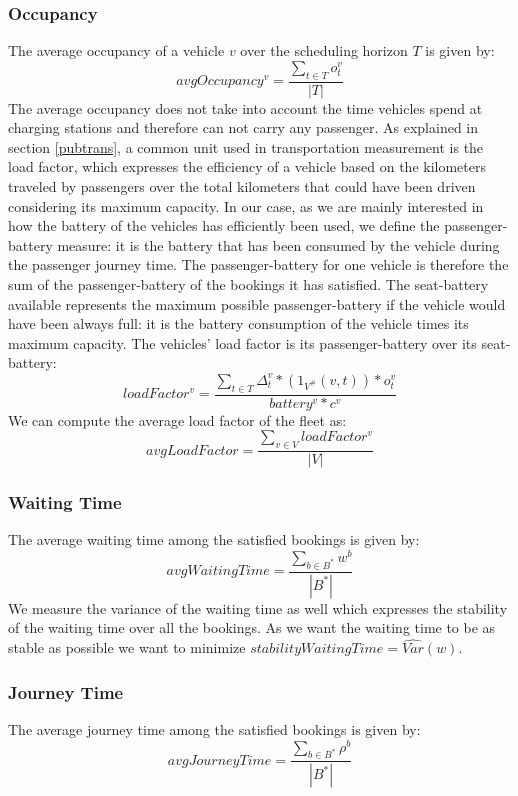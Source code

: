 \documentclass[12pt,a4paper]{article}
\begin{document}
\subsubsection*{Occupancy}
The average occupancy of a vehicle $v$ over the scheduling horizon $T$ is given by:
$$avgOccupancy^{v} = \frac{\sum_{t \in T}o^{v}_{t}}{|T|}$$
The average occupancy does not take into account the time vehicles spend at charging stations and therefore can not carry any passenger. As explained in section \ref{pubtrans}, a common unit used in transportation  measurement is the load factor, which expresses the efficiency of a vehicle based on the kilometers traveled by passengers over the total kilometers that could have been driven considering its maximum capacity. In our case, as we are mainly interested in how the battery of the vehicles has efficiently been used, we define the passenger-battery measure: it is the battery that has been consumed by the vehicle during the passenger journey time. The passenger-battery for one vehicle is therefore the sum of the passenger-battery of the bookings it has satisfied. The seat-battery available represents the maximum possible passenger-battery if the vehicle would have been always full: it is the battery consumption of the vehicle times its maximum capacity. The vehicles' load factor is its passenger-battery over its seat-battery:
$$loadFactor^{v} = \frac{\sum_{t \in T} \Delta^{v}_{t} * (1_{V^{\#}}(v,t)) * o^{v}_{t}}{battery^{v} * c^{v}}$$
We can compute the average load factor of the fleet as:
$$avgLoadFactor = \frac{\sum_{v \in V}loadFactor^{v}}{|V|}$$
\subsubsection*{Waiting Time}
The average waiting time among the satisfied bookings is given by: 
$$avgWaitingTime = \frac{\sum_{b \in B^{*}}w^{b}}{|B^{*}|} $$
We measure the variance of the waiting time as well which expresses the stability of the waiting time over all the bookings. As we want the waiting time to be as stable as possible we want to minimize $stabilityWaitingTime = \widehat{Var}(w)$.

\subsubsection*{Journey Time}
The average journey time among the satisfied bookings is given by:
$$avgJourneyTime = \frac{\sum_{b \in B^{*}}\rho^{b}}{|B^{*}|} $$
\end{document}
